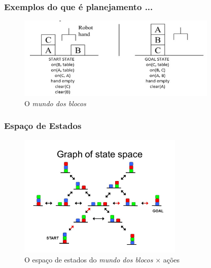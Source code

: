 \begin{frame}[fragile]
\frametitle{Exemplos do que é planejamento ...}

\begin{figure}[!htb]
\centering
\includegraphics[width=0.850\textwidth, height=0.650\textheight]{figures/mundo_dos_blocos01.jpg}
\caption{O \textit{mundo dos blocos}}
\end{figure}


\end{frame}


\begin{frame}[fragile]
\frametitle{Espaço de Estados}

\begin{figure}[!htb]
\centering
\includegraphics[width=0.7\textwidth, height=0.70\textheight]{figures/mundo_dos_blocos02.jpg}
\caption{O espaço de estados do \textit{mundo dos blocos} $\times$ ações}
\end{figure}


\end{frame}



